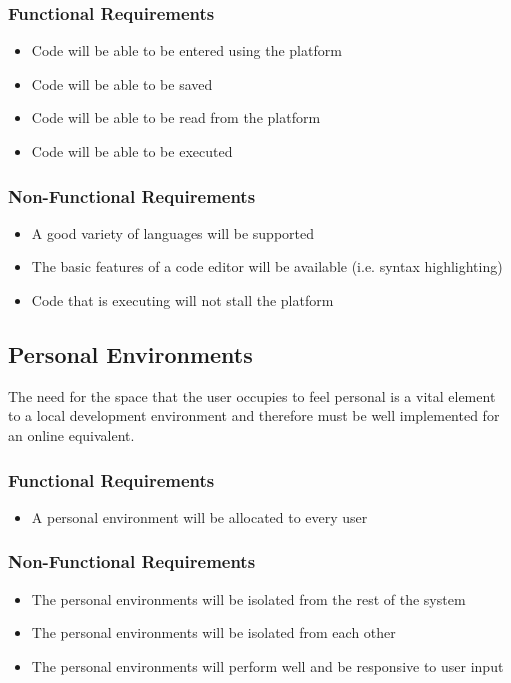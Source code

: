 \subsubsection{Functional Requirements}
\begin{itemize}
    \setlength{\itemsep}{0em}
    \item Code will be able to be entered using the platform
    \item Code will be able to be saved
    \item Code will be able to be read from the platform
    \item Code will be able to be executed
\end{itemize}
\subsubsection{Non-Functional Requirements}
\begin{itemize}
    \setlength{\itemsep}{0em}
    \item A good variety of languages will be supported
    \item The basic features of a code editor will be available (i.e. syntax highlighting)
    \item Code that is executing will not stall the platform
\end{itemize}

\subsection{Personal Environments}
The need for the space that the user occupies to feel personal is a vital element to a local development environment and therefore must be well implemented for an online equivalent.

\subsubsection{Functional Requirements}
\begin{itemize}
    \setlength{\itemsep}{0em}
    \item A personal environment will be allocated to every user
\end{itemize}
\subsubsection{Non-Functional Requirements}
\begin{itemize}
    \setlength{\itemsep}{0em}
    \item The personal environments will be isolated from the rest of the system
    \item The personal environments will be isolated from each other
    \item The personal environments will perform well and be responsive to user input
\end{itemize}

